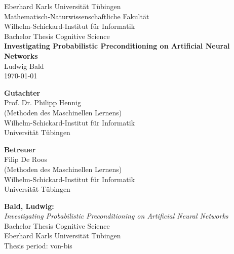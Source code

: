 \documentclass[twoside,12pt,a4paper]{report}
\begin{document}

\begin{titlepage}
	\begin{center}
		{\LARGE Eberhard Karls Universit\"at T\"ubingen}\\
		{\large Mathematisch-Naturwissenschaftliche Fakult\"at \\
			Wilhelm-Schickard-Institut f\"ur Informatik\\[4cm]}
		{\huge Bachelor Thesis Cognitive Science\\[2cm]}
		{\Large\bf  Investigating Probabilistic Preconditioning on Artificial Neural Networks \\[1.5cm]}
		{\large Ludwig Bald}\\[0.5cm]
		\today \\[4cm]
		\parbox{7cm}{\begin{center}{{\small\bf Gutachter}\\
				[0.5cm]\large Prof. Dr. Philipp Hennig}\\
				(Methoden des Maschinellen Lernens)\\
				{\footnotesize Wilhelm-Schickard-Institut f\"ur Informatik\\
				Universit\"at T\"ubingen}\end{center}}\hfill\parbox{7cm}
				{\begin{center}
				{\small\bf Betreuer}\\[0.5cm]
				{\large Filip De Roos}\\
				(Methoden des Maschinellen Lernens)\\
				{\footnotesize Wilhelm-Schickard-Institut f\"ur Informatik\\
					Universit\"at T\"ubingen}\end{center}
		}
	\end{center}
\end{titlepage}



\thispagestyle{empty}
\vspace*{\fill}
\begin{minipage}{11.2cm}
	\textbf{Bald, Ludwig:}\\
	\emph{Investigating Probabilistic Preconditioning on Artificial Neural Networks}\\ Bachelor Thesis Cognitive Science\\
	Eberhard Karls Universit\"at T\"ubingen\\
	Thesis period: von-bis
\end{minipage}
\newpage
\end{document}
